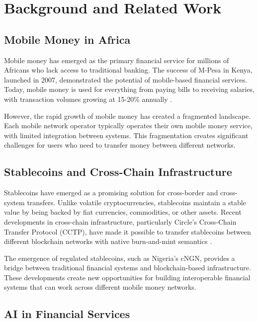 \documentclass[11pt,a4paper]{article}
\begin{document}
\section{Background and Related Work}

\subsection{Mobile Money in Africa}

Mobile money has emerged as the primary financial service for millions of Africans who lack access to traditional banking. The success of M-Pesa in Kenya, launched in 2007, demonstrated the potential of mobile-based financial services. Today, mobile money is used for everything from paying bills to receiving salaries, with transaction volumes growing at 15-20\% annually \cite{gsma2024}.

However, the rapid growth of mobile money has created a fragmented landscape. Each mobile network operator typically operates their own mobile money service, with limited integration between systems. This fragmentation creates significant challenges for users who need to transfer money between different networks.

\subsection{Stablecoins and Cross-Chain Infrastructure}

Stablecoins have emerged as a promising solution for cross-border and cross-system transfers. Unlike volatile cryptocurrencies, stablecoins maintain a stable value by being backed by fiat currencies, commodities, or other assets. Recent developments in cross-chain infrastructure, particularly Circle's Cross-Chain Transfer Protocol (CCTP), have made it possible to transfer stablecoins between different blockchain networks with native burn-and-mint semantics \cite{circle2024}.

The emergence of regulated stablecoins, such as Nigeria's cNGN, provides a bridge between traditional financial systems and blockchain-based infrastructure. These developments create new opportunities for building interoperable financial systems that can work across different mobile money networks.

\subsection{AI in Financial Services}
\end{document}
